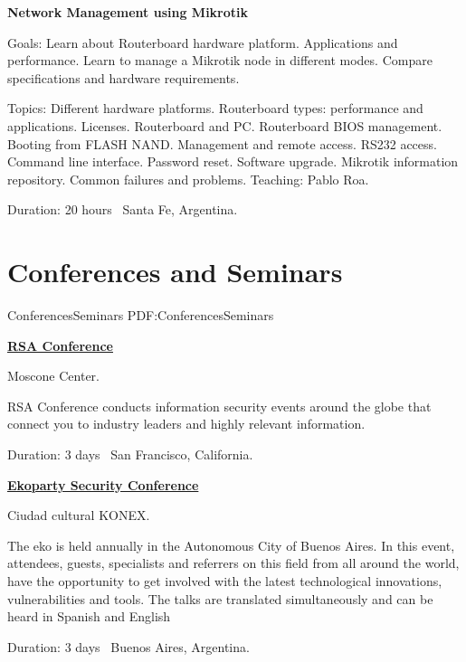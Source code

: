 \documentclass[letterpaper,MMMyyyy,nonstop]{simpleresumecv}
\begin{document}
\begin{body}
\begin{detail}
\end{detail}


\BigGap
\textbf{Network Management using Mikrotik}
\hfill
{}

\BulletItem Goals: Learn about Routerboard hardware platform. Applications and performance. Learn to manage a Mikrotik node in different modes. Compare specifications and hardware requirements.
\begin{detail}
	\SubBulletItem 
	Topics: Different hardware platforms. Routerboard types: performance and applications. Licenses. Routerboard and PC. Routerboard BIOS management. Booting from FLASH NAND. Management and remote access. RS232 access. Command line interface. Password reset. Software upgrade. Mikrotik information repository. Common failures and problems.
	\SubBulletItem Teaching: Pablo Roa.
\end{detail}
Duration: 20 hours \SubBulletSymbol\, Santa Fe, Argentina.



\section{Conferences\newline 
	and Seminars}
{ConferencesSeminars}
{PDF:ConferencesSeminars}

\href{https://www.rsaconference.com/events/us18}{\textbf{RSA Conference}}
\hfill
{}

\BulletItem Moscone Center.
\begin{detail}
	\SubBulletItem
	RSA Conference conducts information security events around the globe that connect you to industry leaders and highly relevant information.
\end{detail}
Duration: 3 days \SubBulletSymbol\, San Francisco, California.

\BigGap

\href{https://www.ekoparty.org/acerca-ekoparty.php}{\textbf{Ekoparty Security Conference}}
\hfill
{}

\BulletItem Ciudad cultural KONEX.
\begin{detail}
	\SubBulletItem
	The eko is held annually in the Autonomous City of Buenos Aires. In this event, attendees, guests, specialists and referrers on this field from all around the world, have the opportunity to get involved with the latest technological innovations, vulnerabilities and tools. The talks are translated simultaneously and can be heard in Spanish and English
\end{detail}
Duration: 3 days \SubBulletSymbol\, Buenos Aires, Argentina.


\end{body}
\end{document}
